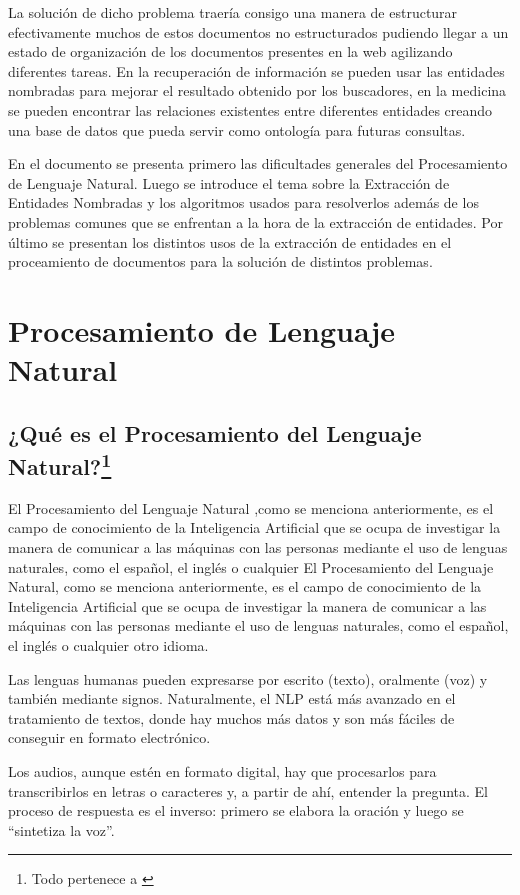 \documentclass[runningheads]{llncs}
\begin{document}
La solución de dicho problema traería consigo una manera de estructurar efectivamente muchos de estos documentos no estructurados pudiendo llegar a un estado de organización de los documentos presentes en la web agilizando diferentes tareas. En la recuperación de información se pueden usar las entidades nombradas para mejorar el resultado obtenido por los buscadores, en la medicina se pueden encontrar las relaciones existentes entre diferentes entidades creando una base de datos que pueda servir como ontología para futuras consultas.

En el documento se presenta primero las dificultades generales del Procesamiento de Lenguaje Natural. Luego se introduce el tema sobre la Extracción de Entidades Nombradas y los algoritmos usados para resolverlos además de los problemas comunes que se enfrentan a la hora de la extracción de entidades. Por último se presentan los distintos usos de la extracción de entidades en el proceamiento de documentos para la solución de distintos problemas.

\section{Procesamiento de Lenguaje Natural}

\subsection{¿Qué es el Procesamiento del Lenguaje Natural?\protect\footnote{Todo pertenece a \cite{nlp}}}
El Procesamiento del Lenguaje Natural ,como se menciona anteriormente, es el campo de conocimiento de la Inteligencia Artificial que se ocupa de investigar la manera de comunicar a las máquinas con las personas mediante el uso de lenguas naturales, como el español, el inglés o cualquier 
El Procesamiento del Lenguaje Natural, como se menciona anteriormente, es el campo de conocimiento de la Inteligencia Artificial que se ocupa de investigar la manera de comunicar a las máquinas con las personas mediante el uso de lenguas naturales, como el español, el inglés o cualquier 
otro idioma.

Las lenguas humanas pueden expresarse por escrito (texto), oralmente (voz) y también mediante signos. Naturalmente, el NLP está más avanzado en el tratamiento de textos, donde hay muchos más datos y son más fáciles de conseguir en formato electrónico.

Los audios, aunque estén en formato digital, hay que procesarlos para transcribirlos en letras o caracteres y, a partir de ahí, entender la pregunta. El proceso de respuesta es el inverso: primero se elabora la oración y luego se “sintetiza la voz”.
\end{document}
